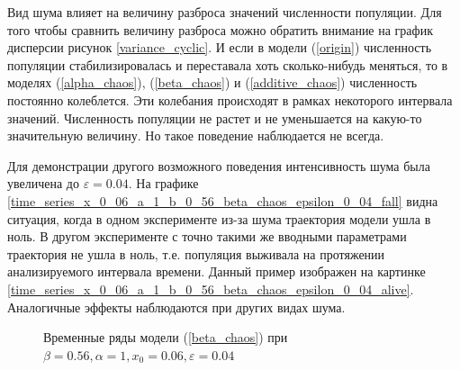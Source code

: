     Вид шума влияет на величину разброса значений численности популяции. Для того чтобы сравнить величину разброса можно обратить внимание на график дисперсии рисунок \ref{variance_cyclic}. И если в модели (\ref{origin}) численность популяции стабилизировалась и переставала хоть сколько-нибудь меняться, то в моделях (\ref{alpha_chaos}), (\ref{beta_chaos}) и (\ref{additive_chaos}) численность постоянно колеблется. Эти колебания происходят в рамках некоторого интервала значений. Численность популяции не растет и не уменьшается на какую-то значительную величину. Но такое поведение наблюдается не всегда.

    Для демонстрации другого возможного поведения интенсивность шума была увеличена до \(\varepsilon = 0.04\). На графике \ref{time_series_x_0_06_a_1_b_0_56_beta_chaos_epsilon_0_04_fall} видна ситуация, когда в одном эксперименте из-за шума траектория модели ушла в ноль. В другом эксперименте с точно такими же вводными параметрами траектория не ушла в ноль, т.е. популяция выживала на протяжении анализируемого интервала времени. Данный пример изображен на картинке \ref{time_series_x_0_06_a_1_b_0_56_beta_chaos_epsilon_0_04_alive}. Аналогичные эффекты наблюдаются при других видах шума.

    \begin{figure}
        \centering
        
        \captionsetup{justification=centering}
        \caption{Временные ряды модели (\ref{beta_chaos}) при \(\beta = 0.56, \alpha = 1, x_0 = 0.06, \varepsilon = 0.04\)}
    \end{figure}


